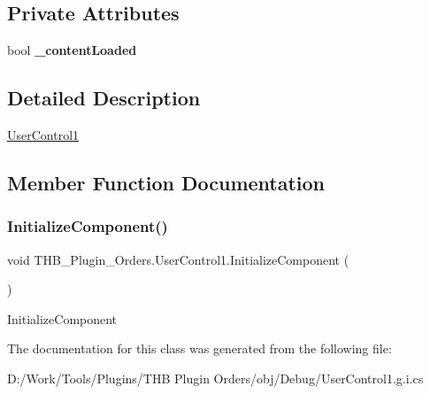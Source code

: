 \subsection*{Private Attributes}
\begin{DoxyCompactItemize}
\item 
\mbox{\label{class_t_h_b___plugin___orders_1_1_user_control1_a7d0a1a76f48fc70682dd70cdbfdcf690}} 
bool {\bfseries \+\_\+content\+Loaded}
\end{DoxyCompactItemize}


\subsection{Detailed Description}
\mbox{\hyperlink{class_t_h_b___plugin___orders_1_1_user_control1}{User\+Control1}} 



\subsection{Member Function Documentation}
\mbox{\label{class_t_h_b___plugin___orders_1_1_user_control1_ab6bf9301231de03e2f7bad2f7d436c3f}} 
\subsubsection{\texorpdfstring{Initialize\+Component()}{InitializeComponent()}}
{\footnotesize\ttfamily void T\+H\+B\+\_\+\+Plugin\+\_\+\+Orders.\+User\+Control1.\+Initialize\+Component (\begin{DoxyParamCaption}{ }\end{DoxyParamCaption})}



Initialize\+Component 



The documentation for this class was generated from the following file\+:\begin{DoxyCompactItemize}
\item 
D\+:/\+Work/\+Tools/\+Plugins/\+T\+H\+B Plugin Orders/obj/\+Debug/User\+Control1.\+g.\+i.\+cs\end{DoxyCompactItemize}
